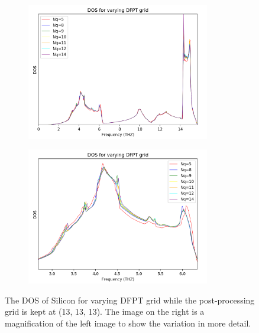 \documentclass[12pt]{article}
\begin{document}
\begin{figure}[!htpb]
	\begin{subfigure}{0.5\textwidth}
	\centering
	\includegraphics[width=8cm]{../Figures/dos_dfpt_vary.png}
	\subcaption{}
	\label{fig:dfptdoswhole}
\end{subfigure}%
	\begin{subfigure}{0.5\textwidth}
	\centering
	\includegraphics[width=8cm]{../Figures/dos_dfpt_vary_zoom.png}
	\subcaption{}
	\label{fig:dfptdoszoom}
\end{subfigure}%
\caption{The DOS of Silicon for varying DFPT grid while the post-processing grid is kept at (13, 13, 13). The image on the right is a magnification of the left image to show the variation in more detail.}
\label{fig:dfptdos}
\end{figure}
\end{document}
